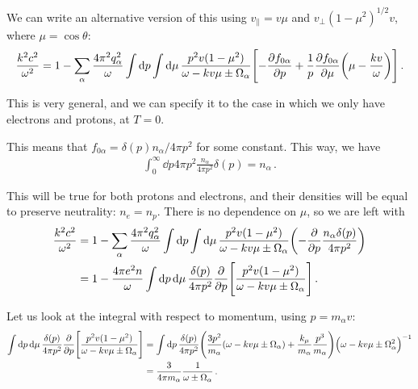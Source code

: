 \documentclass[main.tex]{subfiles}
\begin{document}
We can write an alternative version of this using \(v_\parallel = v \mu \) and \(v_\perp (1 - \mu^2)^{1/2} v\), where \(\mu = \cos \theta \): 
\begin{align}
\frac{k^2 c^2}{\omega^2} = 1 - \sum _{\alpha } \frac{4 \pi^2 q_\alpha^2}{\omega } \int \dd{p} \int \dd{\mu } \frac{p^2 v (1 - \mu^2)}{\omega - kv \mu \pm \Omega _\alpha }
\qty[- \pdv{f_{0 \alpha }}{p} + \frac{1}{p} \pdv{f_{0 \alpha }}{\mu } \qty(\mu - \frac{kv}{\omega })]
\,.
\end{align}

This is very general, and we can specify it to the case in which we only have electrons and protons, at \(T = 0\). 

This means that \(f_{0 \alpha } = \delta (p) n_\alpha / 4 \pi p^2\) for some constant. 
This way, we have 
%
\begin{align}
\int_0^{\infty } \dd{p} 4 \pi p^2 \frac{n_\alpha}{4 \pi p^2} \delta (p) = n_\alpha 
\,.
\end{align}

This will be true for both protons and electrons, and their densities will be equal to preserve neutrality: \(n_e = n_p\). 
There is no dependence on \(\mu \), so we are left with 
%
\begin{align}
\frac{k^2 c^2}{\omega^2} &= 
1 - \sum _{\alpha } \frac{4 \pi^2 q_\alpha^2}{\omega } \int \dd{p} \int \dd{\mu } 
\frac{p^2 v (1 - \mu^2)}{\omega - kv \mu \pm \Omega _\alpha }
\qty(- \pdv{}{p} \frac{n_\alpha \delta (p)}{4 \pi p^2})  \\
&= 1 - \frac{4 \pi e^2 n}{\omega } \int \dd{p} \dd{\mu }
\frac{ \delta (p)}{4 \pi p^2} \pdv{}{p}  \qty[\frac{p^2 v (1 - \mu^2)}{\omega - k v \mu \pm \Omega _\alpha }]
\,.
\end{align}

Let us look at the integral with respect to momentum, using \(p = m_\alpha v\): 
%
\begin{align}
\int \dd{p} \dd{\mu }
\frac{ \delta (p)}{4 \pi p^2} \pdv{}{p}  \qty[\frac{p^2 v (1 - \mu^2)}{\omega - k v \mu \pm \Omega _\alpha }] 
&= \int \dd{p} \frac{ \delta (p)}{4 \pi p^2} \qty( \frac{3 p^2}{m_\alpha } (\omega - k v \mu \pm \Omega _\alpha ) + \frac{k_\mu }{m_\alpha } \frac{p^3}{m_\alpha }) \qty(\omega - k v \mu \pm \Omega_\alpha^2)^{-1}   \\
&= \frac{3}{4 \pi m_\alpha } \frac{1}{\omega \pm \Omega _\alpha }
\,.
\end{align}
\end{document}
